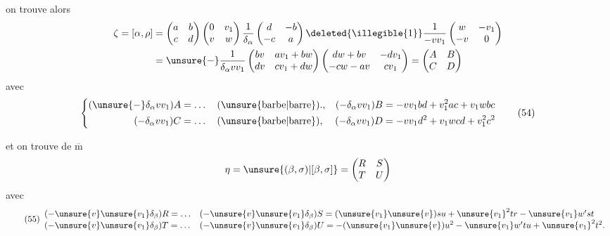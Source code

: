 on trouve alors
\[
\begin{aligned}
\zeta=[\alpha,\rho]
&=\begin{pmatrix}a&b\\c&d\end{pmatrix}
\begin{pmatrix}0&v_1\\v&w\end{pmatrix}
\frac1{\delta_\alpha}\begin{pmatrix}d&-b\\-c&a\end{pmatrix}
\deleted{\illegible{1}}\frac1{-vv_1}\begin{pmatrix}w&-v_1\\-v&0\end{pmatrix}\\
&=\unsure{-}\frac1{\delta_\alpha vv_1}
\begin{pmatrix}bv&av_1+bw\\dv&cv_1+dw\end{pmatrix}
\begin{pmatrix}dw+bv&-dv_1\\-cw-av&cv_1\end{pmatrix}
=\begin{pmatrix}A&B\\C&D\end{pmatrix}
\end{aligned}
\]
avec
\[
\left\{\begin{aligned}
(\unsure{-}\delta_\alpha vv_1)A&=\ldots\quad\text{(\unsure{barbe|barre}).},
&(-\delta_\alpha vv_1)B&=-vv_1bd+v_1^2ac+v_1wbc\\
(-\delta_\alpha vv_1)C&=\ldots\quad\text{(\unsure{barbe|barre})},
&(-\delta_\alpha vv_1)D&=-vv_1d^2+v_1wcd+v_1^2c^2
\end{aligned}\right. \tag{54}
\]


et on trouve de $\overline{\mathrm m}$
\[
\eta=\unsure{(\beta,\sigma)|[\beta,\sigma]}=
\begin{pmatrix}R&S\\T&U\end{pmatrix}
\]
avec
\[
\tag{55}
\begin{array}{ll}
(-\unsure{v}\unsure{v_1}\delta_\beta)R=\ldots
&(-\unsure{v}\unsure{v_1}\delta_\beta)S
 =(\unsure{v_1}\unsure{v})su+\unsure{v_1}^{2}tr-\unsure{v_1}w'st\\
(-\unsure{v}\unsure{v_1}\delta_\beta)T=\ldots
&(-\unsure{v}\unsure{v_1}\delta_\beta)U
 =-(\unsure{v_1}\unsure{v})u^2-\unsure{v_1}w'tu+\unsure{v_1}^{2}t^2.
\end{array}
\]

